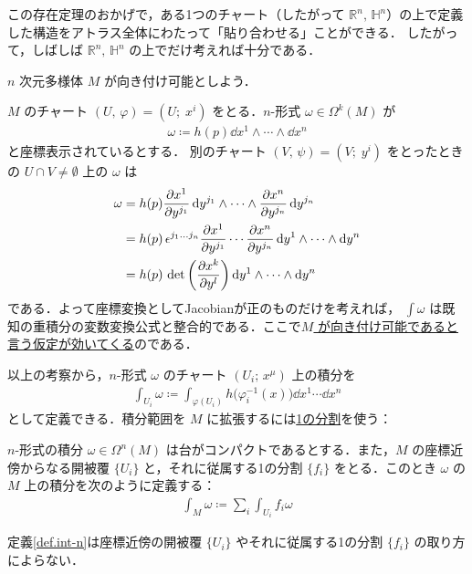 \documentclass[geometry_main]{subfiles}
\begin{document}
この存在定理のおかげで，ある1つのチャート（したがって $\mathbb{R}^n,\, \mathbb{H}^n$）の上で定義した構造をアトラス全体にわたって「貼り合わせる」ことができる．
したがって，しばしば $\mathbb{R}^n,\, \mathbb{H}^n$ の上でだけ考えれば十分である．


$n$ 次元\cinfty 多様体 $M$ が向き付け可能としよう．

$M$ のチャート $(U,\, \varphi) = (U;\; x^i)$ をとる．$n$-形式 $\omega \in \Omega^k(M)$ が
\begin{align} 
	\omega \coloneqq h(p) \dd{x^1} \wedge \cdots \wedge \dd{x^n}
\end{align}
と座標表示されているとする．
別のチャート $(V,\, \psi) = (V;\; y^i)$ をとったときの $U \cap V \neq \emptyset$ 上の $\omega$ は
\begin{align} 
	\omega &= h(p) \pdv{x^1}{y^{j_1}}\dd{y^{j_1}} \wedge \cdots \wedge \pdv{x^n}{y^{j_n}}\dd{y^{j_n}} \\
	&=  h(p)\, \epsilon^{j_1 \dots j_n} \pdv{x^1}{y^{j_1}} \cdots \pdv{x^n}{y^{j_n}} \dd{y^1} \wedge \cdots \wedge \dd{y^n} \\
	&= h(p)\, \det \left( \pdv{x^k}{y^{l}} \right) \dd{y^1} \wedge \cdots \wedge \dd{y^n}
\end{align}
である．よって座標変換としてJacobianが正のものだけを考えれば， $\displaystyle \int \omega$ は既知の重積分の変数変換公式と整合的である．ここで\underline{$M$ が向き付け可能であると言う仮定が効いてくる}のである．

以上の考察から，$n$-形式 $\omega$ のチャート $(U_i;\, x^\mu)$ 上の積分を
\begin{align} 
	\int_{U_i} \omega \coloneqq \int_{\varphi(U_i)} h\bigl(\varphi^{-1}_i (x)\bigr) \dd{x^1} \cdots \dd{x^n}
\end{align}
として定義できる．積分範囲を $M$ に拡張するには\hyperref[def:PoU]{1の分割}を使う：

\begin{mydef}[label=def.int-n]{$n$-形式の積分} 
	$\omega \in \Omega^n(M)$ は台がコンパクトであるとする．また，$M$ の座標近傍からなる開被覆 $\{U_i\}$ と，それに従属する1の分割 $\{ f_i \}$ をとる．このとき $\omega$ の $M$ 上の積分を次のように定義する：
	\begin{align} 
		\int_M \omega \coloneqq \sum_{i} \int_{U_i} f_i \omega
	\end{align}
\end{mydef}

\begin{myprop}[]{} 
	定義\ref{def.int-n}は座標近傍の開被覆 $\{U_i\}$ やそれに従属する1の分割 $\{f_i\}$ の取り方によらない．
\end{myprop}
\end{document}
